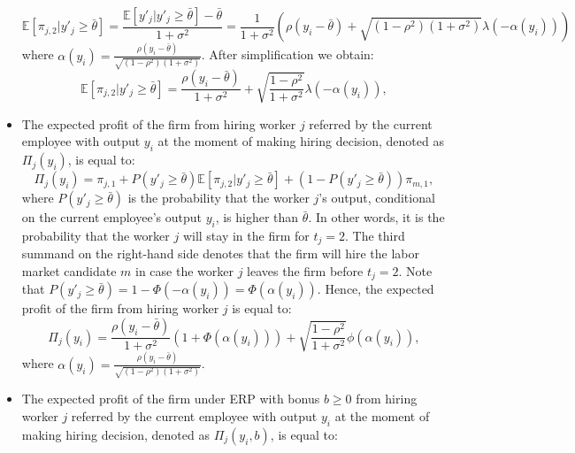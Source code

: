 \documentclass[12pt]{article}
\begin{document}
\begin{itemize}
    \begin{equation*}
        \mathbb{E}[\pi_{j,2}| y'_j \geq \bar{\theta}]
        = \frac{\mathbb{E}[y'_j| y'_j \geq \bar{\theta}]-\bar{\theta}}{1+\sigma^2}
        = \frac{1}{1+\sigma^2}\left( \rho(y_i - \bar{\theta}) + \sqrt{(1-\rho^2)(1+\sigma^2)} \lambda(-\alpha(y_i)) \right)
    \end{equation*}
    where $\alpha(y_i) = \frac{\rho\left(y_i - \bar{\theta}\right)}{\sqrt{(1-\rho^2)(1+\sigma^2)}}$. After simplification we obtain:
    \begin{equation}\label{eq:profit_j_exp_y_i}
        \mathbb{E}[\pi_{j,2}| y'_j \geq \bar{\theta}] = \frac{\rho(y_i - \bar{\theta})}{1+\sigma^2} + \sqrt{\frac{1-\rho^2}{1+\sigma^2}}\lambda(-\alpha(y_i)),
    \end{equation}
    \item The expected profit of the firm from hiring worker $j$ referred by the current employee with output $y_i$ at the moment of making hiring decision, denoted as $\Pi_j(y_i)$, is equal to:
    \begin{equation*}
        \Pi_j(y_i) = \pi_{j,1} + P\left( y'_j \geq \bar{\theta} \right) \mathbb {E}[\pi_{j,2} | y'_j \geq \bar{\theta}] 
        + (1 - P\left( y'_j \geq \bar{\theta} \right)) \pi_{m,1},
    \end{equation*}
    where $P\left( y'_j \geq \bar{\theta} \right)$ is the probability that the worker $j$'s output, conditional on the current employee's output $y_i$, is higher than $\bar{\theta}$. In other words, it is the probability that the worker $j$ will stay in the firm for $t_j = 2$. The third summand on the right-hand side denotes that the firm will hire the labor market candidate $m$ in case the worker $j$ leaves the firm before $t_j = 2$. Note that $P\left( y'_j \geq \bar{\theta} \right) = 1-\Phi(-\alpha(y_i)) = \Phi(\alpha(y_i))$. Hence, the expected profit of the firm from hiring worker $j$ is equal to:
    \begin{equation}\label{eq_pi_j_y_i}
        \Pi_j(y_i) = \frac{\rho\left(y_i-\bar{\theta}\right)}{1+\sigma^2}\left(1+\Phi\left(\alpha(y_i)\right)\right)
        + \sqrt{\frac{1-\rho^2}{1+\sigma^2}}\phi\left(\alpha(y_i)\right),
    \end{equation}
    where $\alpha(y_i) = \frac{\rho\left(y_i - \bar{\theta}\right)}{\sqrt{(1-\rho^2)(1+\sigma^2)}}$.
    \item The expected profit of the firm under ERP with bonus $b \geq 0$ from hiring worker $j$ referred by the current employee with output $y_i$ at the moment of making hiring decision, denoted as $\Pi_j(y_i, b)$, is equal to:

\end{itemize}
\end{document}
